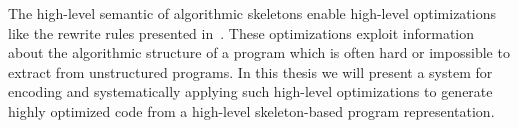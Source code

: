 The high-level semantic of algorithmic skeletons enable high-level optimizations like the rewrite rules presented in~\cite{Gorlatch00}.
These optimizations exploit information about the algorithmic structure of a program which is often hard or impossible to extract from unstructured programs.
In this thesis we will present a system for encoding and systematically applying such high-level optimizations to generate highly optimized code from a high-level skeleton-based program representation.


%
%
%
%

